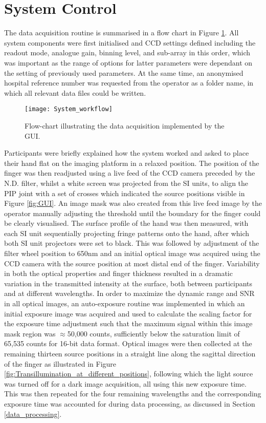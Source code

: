 \documentclass[twoside]{bhamthesis}
\theoremstyle{definition}
\begin{document}
\section{System Control}
\label{system_control}
The data acquisition routine is summarised in a flow chart in Figure \ref{fig:FLOWCHART}. All system components were first initialised and CCD settings defined including the readout mode, analogue gain, binning level, and sub-array in this order, which was important as the range of options for latter parameters were dependant on the setting of previously used parameters. At the same time, an anonymised hospital reference number was requested from the operator as a folder name, in which all relevant data files could be written. 

\begin{figure}[!ht]
\texttt{[image: System\_workflow]}
\centering
\caption{Flow-chart illustrating the data acquisition implemented by the GUI.}
  \label{fig:FLOWCHART}
\end{figure}

Participants were briefly explained how the system worked and asked to place their hand flat on the imaging platform in a relaxed position. The position of the finger was then readjusted using a live feed of the CCD camera preceded by the N.D. filter, whilst a white screen was projected from the SI units, to align the PIP joint with a set of crosses which indicated the source positions   visible in Figure \ref{fig:GUI}. An image mask was also created from this live feed image by the operator manually adjusting the threshold until the boundary for the finger could be clearly visualised. The surface profile of the hand was then measured, with each SI unit sequentially projecting fringe patterns onto the hand, after which both SI unit projectors were set to black. This was followed by adjustment of the filter wheel position to 650nm and an initial optical image was acquired using the CCD camera with the source position at most distal end of the finger. Variability in both the optical properties and finger thickness resulted in a dramatic variation in the transmitted intensity at the surface, both between participants and at different wavelengths. In order to maximize the dynamic range and SNR in all optical images, an auto-exposure routine was implemented in which an initial exposure image was acquired and used to calculate the scaling factor for the exposure time adjustment such that the maximum signal within this image mask region was $\approx$50,000 counts, sufficiently below the saturation limit of 65,535 counts for 16-bit data format. Optical images were then collected at the remaining thirteen source positions in a straight line along the sagittal direction of the finger as illustrated in Figure \ref{fig:Transillumination_at_different_positions}, following which the light source was turned off for a dark image acquisition, all using this new exposure time. This was then repeated for the four remaining wavelengths and the corresponding exposure time was accounted for during data processing, as discussed in Section \ref{data_processing}. 
\end{document}
